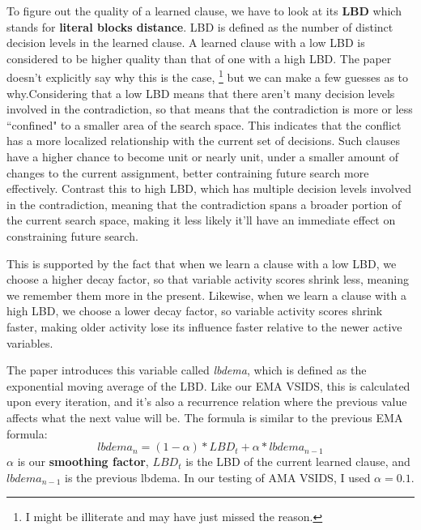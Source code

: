 \documentclass[../main.tex]{subfiles}
\begin{document}
To figure out the quality of a learned clause, we have to look at its \textbf{LBD}
which stands for \textbf{literal blocks distance}. LBD is defined as the number of 
distinct decision levels in the learned clause. A learned clause with a low LBD is considered to be higher 
quality than that of one with a high LBD. The paper doesn't explicitly say why this is the case,
\footnote{I might be illiterate and may have just missed the reason.}
but we can make a few guesses as to why.Considering that a low LBD means that there aren't 
many decision levels involved in the contradiction, so that means that the contradiction 
is more or less ``confined" to a smaller area of the search space. This indicates that 
the conflict has a more localized relationship with the current set of decisions. 
Such clauses have a higher chance to become unit or nearly unit, under a smaller 
amount of changes to the current assignment, better contraining future search more effectively.
Contrast this to high LBD, which has multiple decision levels involved in the contradiction, 
meaning that the contradiction spans a broader portion of the current search space, making 
it less likely it'll have an immediate effect on constraining future search.

This is supported by the fact that when we learn a clause with a low LBD, we choose a 
higher decay factor, so that variable activity scores shrink less, meaning we remember 
them more in the present. Likewise, when we learn a clause with a high LBD, we choose 
a lower decay factor, so variable activity scores shrink faster, making older activity 
lose its influence faster relative to the newer active variables.

The paper introduces this variable called \textit{lbdema}, which is defined as the 
exponential moving average of the LBD. Like our EMA VSIDS, this is calculated 
upon every iteration, and it's also a recurrence relation where the previous value affects 
what the next value will be. The formula is similar to the previous EMA formula:
$${lbdema}_n = (1 - \alpha) * {LBD}_t + \alpha * {lbdema}_{n - 1}$$
$\alpha$ is our \textbf{smoothing factor}, ${LBD}_t$ is the LBD of the current learned clause,
and \\${lbdema}_{n - 1}$ is the previous lbdema. In our testing of AMA VSIDS, I used 
$\alpha = 0.1$. 
\end{document}
